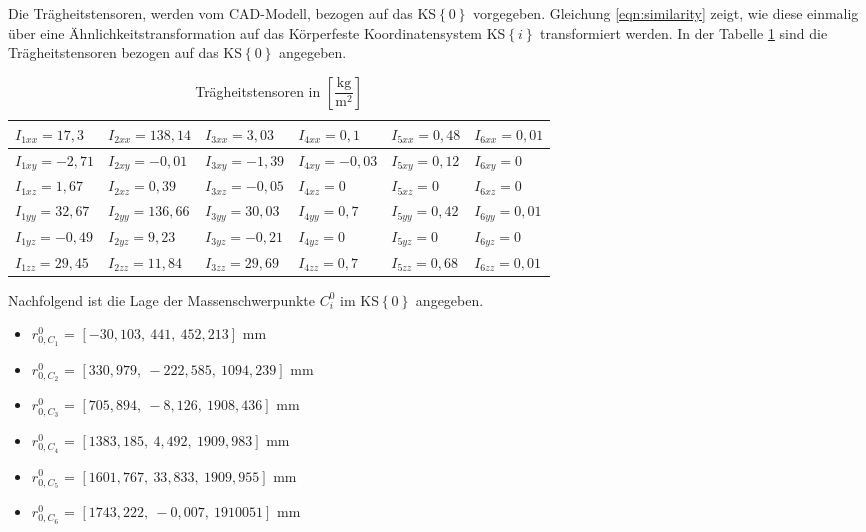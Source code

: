 Die Trägheitstensoren, werden vom CAD-Modell, bezogen auf das KS$\left\{0\right\}$ vorgegeben. Gleichung \ref{eqn:similarity} zeigt, wie diese einmalig über eine Ähnlichkeitstransformation auf das Körperfeste Koordinatensystem KS$\left\{i\right\}$ transformiert werden. In der Tabelle \ref{tab:tensoren} sind die Trägheitstensoren bezogen auf das KS$\left\{0\right\}$ angegeben. 

\begin{table}[hptb]
	\centering
	\caption{Trägheitstensoren in $\left[\dfrac{\text{kg}}{\text{m}^2}\right] $}
	\label{tab:tensoren}
\begin{tabular}{|l|l|l|l|l|l|}
	\hline
	$I_{1xx} = 17,3$&  $I_{2xx} = 138,14$&  $I_{3xx} = 3,03$&  $I_{4xx} = 0,1$&  $I_{5xx} = 0,48$&$I_{6xx} = 0,01$\\
	\hline
	$I_{1xy} = -2,71$&  $I_{2xy} = -0,01$&  $I_{3xy} = -1,39$&  $I_{4xy} = -0,03$&  $I_{5xy} = 0,12$&$I_{6xy} = 0$\\
	\hline
	$I_{1xz} = 1,67$&  $I_{2xz} = 0,39$&  $I_{3xz} = -0,05$&  $I_{4xz} = 0$&  $I_{5xz} = 0$&$I_{6xz} = 0$\\
	\hline
	$I_{1yy} = 32,67$&  $I_{2yy} = 136,66$&  $I_{3yy} = 30,03$&  $I_{4yy} = 0,7$&  $I_{5yy} = 0,42$&$I_{6yy} = 0,01$\\
	\hline
	$I_{1yz} = -0,49$&  $I_{2yz} = 9,23$&   $I_{3yz} = -0,21$&  $I_{4yz} = 0$&  $I_{5yz} = 0$&$I_{6yz} = 0$\\
	\hline
	$I_{1zz} = 29,45$&  $I_{2zz} = 11,84$&  $I_{3zz} = 29,69$&  $I_{4zz} = 0,7$&  $I_{5zz} = 0,68$&$I_{6zz} = 0,01$\\
	\hline
\end{tabular}
\end{table}
Nachfolgend ist die Lage der Massenschwerpunkte $C_i^0$ im KS$\left\{0\right\}$ angegeben. 

\begin{itemize}
	\item[] $r_{0,C_1}^0$ = $\left[-30,103,~441,~452,213\right]$ mm
	\item[] $r_{0,C_2}^0$ = $\left[330,979,~-222,585,~1094,239\right]$ mm
	\item[] $r_{0,C_3}^0$ = $\left[705,894,~-8,126,~1908,436\right]$ mm
	\item[] $r_{0,C_4}^0$ = $\left[1383,185,~4,492,~1909,983\right]$ mm
	\item[] $r_{0,C_5}^0$ = $\left[1601,767,~33,833,~1909,955\right]$ mm
	\item[] $r_{0,C_6}^0$ = $\left[1743,222,~-0,007,~1910 051\right]$ mm
\end{itemize}

